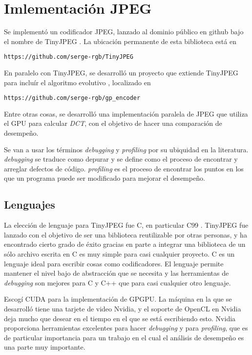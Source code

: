 \chapter{Imlementación JPEG}\label{ch:implementacion}

Se implementó un codificador JPEG, lanzado al dominio público en github bajo el
nombre de TinyJPEG \cite{tiny_jpeg}. La ubicación permanente de esta biblioteca
está en \begin{alltt}https://github.com/serge-rgb/TinyJPEG \end{alltt}

En paralelo con TinyJPEG, se desarrolló un proyecto que extiende TinyJPEG para
incluír el algoritmo evolutivo \cite{gp_encoder}, localizado en
\begin{alltt}https://github.com/serge-rgb/gp_encoder\end{alltt} Entre otras
cosas, se desarrolló una implementación paralela de JPEG que utiliza el GPU
para calcular \emph{DCT}, con el objetivo de hacer una comparación de
desempeño.

Se van a usar los términos \emph{debugging} y \emph{profiling} por su ubiquidad en la literatura. \emph{debugging} se traduce como depurar y se define como el proceso de encontrar y arreglar defectos de código. \emph{profiling} es el proceso de encontrar los puntos en los que un programa puede ser modificado para mejorar el desempeño.

\section{Lenguajes}

La elección de lenguaje para TinyJPEG fue C, en particular C99 \cite{c99}.
TinyJPEG fue lanzado con el objetivo de ser una biblioteca reutilizable por
otras personas, y ha encontrado cierto grado de éxito gracias en parte a
integrar una biblioteca de un sólo archivo escrita en C es muy simple para casi
cualquier proyecto. C es un lenguaje ideal para escribir cosas como
codificadores. El lenguaje permite mantener el nivel bajo de abstracción que se
necesita y las herramientas de \emph{debugging} son mejores para C y C++ que
para casi cualquier otro lenguaje.

Escogí CUDA para la implementación de GPGPU. La máquina en la que se desarrolló
tiene una tarjete de video Nvidia, y el soporte de OpenCL en Nvidia deja mucho
que desear en el tiempo en el que se está escribiendo esto. Nvidia proporciona
herramientas excelentes para hacer \emph{debugging} y para \emph{profiling},
que es de particular importancia para un trabajo en el cual el análisis de
desempeño es una parte muy importante.

